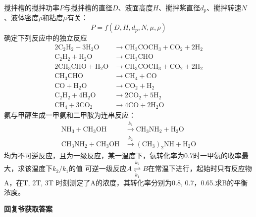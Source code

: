 \documentclass{hm}
\begin{document}
搅拌槽的搅拌功率$P$与搅拌槽的直径$D$、液面高度$H$、搅拌桨直径$d_p$、搅拌转速$N$、液体密度$\rho$和粘度$\mu$有关：\[P=f(D,H,d_p,N,\mu,\rho)\]
确定下列反应中的独立反应
\begin{align*}
  2 \mathrm{C}_{2} \mathrm{H}_{2}+3 \mathrm{H}_{2} \mathrm{O}&\longrightarrow\mathrm{CH}_{3} \mathrm{COCH}_{3}+\mathrm{CO}_{2}+2 \mathrm{H}_{2} \\
  \mathrm{C}_{2} \mathrm{H}_{2}+\mathrm{H}_{2} \mathrm{O}&\longrightarrow\mathrm{CH}_{3} \mathrm{CHO} \\
  2 \mathrm{CH}_{3} \mathrm{CHO}+\mathrm{H}_{2} \mathrm{O}&\longrightarrow\mathrm{CH}_{3} \mathrm{COCH}_{3}+\mathrm{CO}_{2}+2 \mathrm{H}_{2} \\
  \mathrm{CH}_{3} \mathrm{CHO} &\longrightarrow \mathrm{CH}_{4}+\mathrm{CO} \\
  \mathrm{CO}+\mathrm{H}_{2} \mathrm{O}&\longrightarrow\mathrm{CO}_{2}+\mathrm{H}_{2} \\
  \mathrm{C}_{2} \mathrm{H}_{2}+4 \mathrm{H}_{2} \mathrm{O}&\longrightarrow2 \mathrm{CO}_{2}+5 \mathrm{H}_{2} \\
  \mathrm{CH}_{4}+3 \mathrm{CO}_{2} &\longrightarrow 4 \mathrm{CO}+2 \mathrm{H}_{2} \mathrm{O}
\end{align*}
氨与甲醇生成一甲氨和二甲胺为连串反应：
\begin{align*}
  \mathrm{NH}_{3}+\mathrm{CH}_{3} \mathrm{OH} &\stackrel{k_{1}}{\longrightarrow} \mathrm{CH}_{3} \mathrm{NH}_{2}+\mathrm{H}_{2} \mathrm{O} \\
  \mathrm{CH}_{3} \mathrm{NH}_{2}+\mathrm{CH}_{3} \mathrm{OH} &\stackrel{k_{2}}{\longrightarrow}\left(\mathrm{CH}_{3}\right)_{2} \mathrm{NH}+\mathrm{H}_{2} \mathrm{O}
\end{align*}
均为不可逆反应，且为一级反应，某一温度下，氨转化率为0.7时一甲氨的收率最大，求该温度下$k_2/k_1$的值
可逆一级反应$A\overset{k_2}{\underset{k_1}{\rightleftharpoons}}B$在常温下进行，起始时只有反应物A，在T, 2T, 3T 时刻测定了A的浓度，其转化率分别为0.8, 0.7，0.65.求B的平衡浓度。

\textbf{回复爷获取答案}
\end{document}
